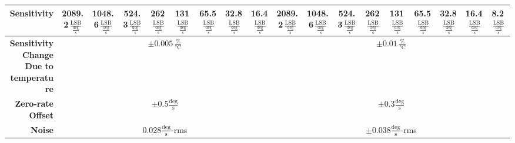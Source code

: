 \documentclass[fontsize=11pt,%
twoside,%
BCOR          = 8mm, %
DIV           = 11,  %
titlepage     = off,%
index=totoc,%
xcolor        = pdftex,%
dvipsnames,%
bibliography  = totoc,%
bibliography = numbered, %
listof        = notnumbered]{scrreprt}
\begin{document}
\begin{table}
\begin{adjustbox}{width=1.05\textwidth}
\begin{tabular}{|r||c|c|c|c|c|c|c|c||c|c|c|c|c|c|c|c|c|}
			\textbf{Sensitivity} & 2089.2\,$\frac{\text{LSB}}{\frac{\text{deg}}{\text{s}}}$ & 1048.6\,$\frac{\text{LSB}}{\frac{\text{deg}}{\text{s}}}$ & 524.3\,$\frac{\text{LSB}}{\frac{\text{deg}}{\text{s}}}$ & 262\,$\frac{\text{LSB}}{\frac{\text{deg}}{\text{s}}}$ & 131\,$\frac{\text{LSB}}{\frac{\text{deg}}{\text{s}}}$ & 65.5\,$\frac{\text{LSB}}{\frac{\text{deg}}{\text{s}}}$ & 32.8\,$\frac{\text{LSB}}{\frac{\text{deg}}{\text{s}}}$ & 16.4\,$\frac{\text{LSB}}{\frac{\text{deg}}{\text{s}}}$ & 2089.2\,$\frac{\text{LSB}}{\frac{\text{deg}}{\text{s}}}$ & 1048.6\,$\frac{\text{LSB}}{\frac{\text{deg}}{\text{s}}}$ & 524.3\,$\frac{\text{LSB}}{\frac{\text{deg}}{\text{s}}}$ & 262\,$\frac{\text{LSB}}{\frac{\text{deg}}{\text{s}}}$ & 131\,$\frac{\text{LSB}}{\frac{\text{deg}}{\text{s}}}$ & 65.5\,$\frac{\text{LSB}}{\frac{\text{deg}}{\text{s}}}$ & 32.8\,$\frac{\text{LSB}}{\frac{\text{deg}}{\text{s}}}$ & 16.4\,$\frac{\text{LSB}}{\frac{\text{deg}}{\text{s}}}$ & 8.2\,$\frac{\text{LSB}}{\frac{\text{deg}}{\text{s}}}$ \\ \hline
			
			\shortstack[r]{\textbf{Sensitivity Change} \\ \textbf{Due to temperature}} & \multicolumn{8}{c||}{$\pm0.005\,\frac{\%}{°\text{C}}$} & \multicolumn{9}{c|}{$\pm0.01\,\frac{\%}{°\text{C}}$} \\ \hline
			
			\textbf{Zero-rate Offset} & \multicolumn{8}{c||}{$\pm0.5\frac{\text{deg}}{\text{s}}$} & \multicolumn{9}{c|}{$\pm0.3\frac{\text{deg}}{\text{s}}$} \\ \hline
			
			\textbf{Noise} & \multicolumn{8}{c||}{$0.028\frac{\text{deg}}{\text{s}}$-rms} & \multicolumn{9}{c|}{$\pm0.038\frac{\text{deg}}{\text{s}}$-rms} \\ \hline
		\end{tabular}
	\end{adjustbox}
\end{table}
\end{document}
